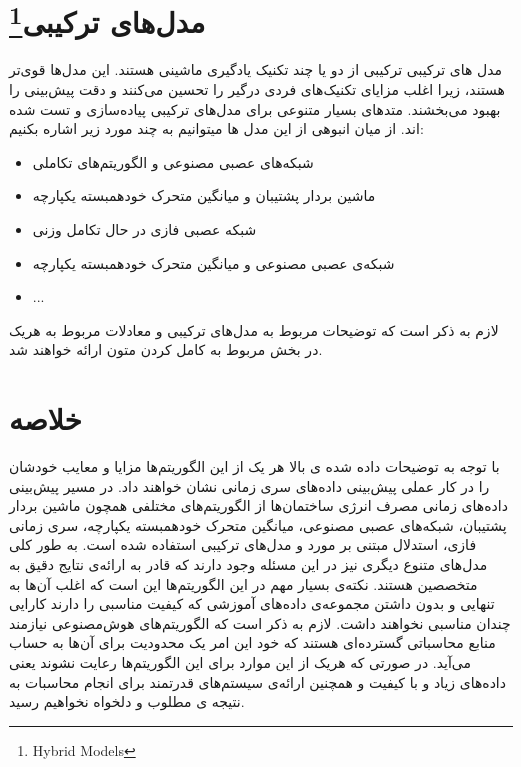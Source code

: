 \section{مدل‌های ترکیبی‌\footnote{Hybrid Models}}
مدل های ترکیبی ترکیبی از دو یا چند تکنیک یادگیری ماشینی هستند. این مدل‌ها قوی‌تر هستند، 
زیرا اغلب مزایای تکنیک‌های فردی درگیر را تحسین می‌کنند و دقت پیش‌بینی را بهبود می‌بخشند.
متد‌های بسیار متنوعی برای مدل‌های ترکیبی پیاده‌سازی و تست شده اند. از میان انبوهی از این مدل ها میتوانیم به چند مورد زیر اشاره بکنیم:
\begin{itemize}
    \item شبکه‌های عصبی مصنوعی و الگوریتم‌های تکاملی\cite{azadeh2007integration}
    \item ماشین بردار پشتیبان و میانگین متحرک خودهمبسته یکپارچه\cite{nie2012hybrid}
    \item شبکه عصبی فازی در حال تکامل وزنی \cite{chang2011monthly}
    \item شبکه‌ی عصبی مصنوعی و میانگین متحرک خودهمبسته یکپارچه\cite{wang2014techniques}
    \item ...
\end{itemize}

لازم به ذکر است که توضیحات مربوط به مدل‌های ترکیبی و معادلات مربوط به هریک در بخش مربوط به کامل کردن متون ارائه خواهند شد.
\section{خلاصه}

با توجه به توضیحات داده شده ی بالا هر یک از این الگوریتم‌ها مزایا و معایب خودشان را در کار عملی پیش‌بینی داده‌های سری زمانی نشان خواهند داد. 
 در مسیر پیش‌بینی داده‌های زمانی مصرف انرژی ساختمان‌ها از الگوریتم‌های مختلفی همچون 
 ماشین بردار پشتیبان، شبکه‌های عصبی مصنوعی، میانگین متحرک خودهمبسته یکپارچه، سری زمانی فازی، استدلال مبتنی بر مورد و مدل‌های ترکیبی استفاده شده است.
 به طور کلی مدل‌های متنوع دیگری نیز در این مسئله وجود دارند که قادر به ارائه‌ی نتایج دقیق به متخصصین هستند. نکته‌ی بسیار مهم در این الگوریتم‌ها این است که اغلب آن‌ها به تنهایی و بدون داشتن مجموعه‌ی داده‌های آموزشی که کیفیت مناسبی را دارند
 کارایی چندان مناسبی نخواهند داشت. لازم به ذکر است که الگوریتم‌های هوش‌مصنوعی نیازمند منابع محاسباتی گسترده‌ای هستند که خود این امر یک محدودیت برای آن‌ها به حساب می‌آید.
 در صورتی که هریک از این موارد برای این الگوریتم‌ها رعایت نشوند یعنی داده‌های زیاد و با کیفیت و همچنین ارائه‌ی سیستم‌های قدرتمند برای انجام محاسبات به نتیجه ی مطلوب و دلخواه نخواهیم رسید.